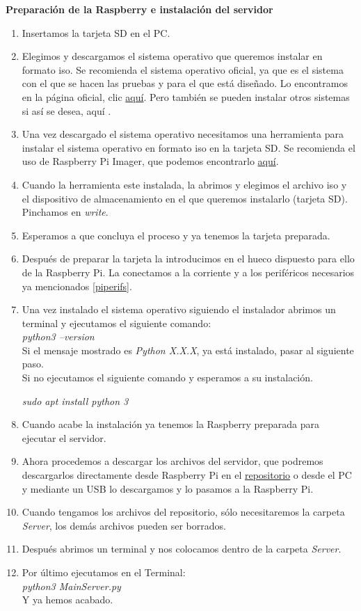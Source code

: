 \textbf{Preparación de la Raspberry e instalación del servidor}\\

\begin{enumerate}
\item
	Insertamos la tarjeta SD en el PC.
\item
	Elegimos y descargamos el sistema operativo que queremos instalar en formato iso.
	Se recomienda el sistema operativo oficial, ya que es el sistema con el que se hacen las pruebas y para el que está diseñado. Lo encontramos en la página oficial, clic \href{https://www.raspberrypi.org/software/operating-systems/#raspberry-pi-os-32-bit}{aquí}.
	Pero también se pueden instalar otros sistemas si así se desea, aquí \cite{pios}.
\item
	Una vez descargado el sistema operativo necesitamos una herramienta para instalar el sistema operativo en formato iso en la tarjeta SD.
	Se recomienda el uso de Raspberry Pi Imager, que podemos encontrarlo \href{https://www.raspberrypi.org/software/}{aquí}.
\item
	Cuando la herramienta este instalada, la abrimos y elegimos el archivo iso y el dispositivo de almacenamiento en el que queremos instalarlo (tarjeta SD).
	Pinchamos en \textit{write}.
\item
	Esperamos a que concluya el proceso y ya tenemos la tarjeta preparada.
\item
	Después de preparar la tarjeta la introducimos en el hueco dispuesto para ello de la Raspberry Pi. La conectamos a la corriente y a los periféricos necesarios ya mencionados \ref{piperifs}.
\item
	Una vez instalado el sistema operativo siguiendo el instalador abrimos un terminal y ejecutamos el siguiente comando:\\
	\textit{python3 --version}\\
	Si el mensaje mostrado es \textit{Python X.X.X}, ya está instalado, pasar al siguiente paso.\\
	Si no ejecutamos el siguiente comando y esperamos a su instalación.
	
	\textit{sudo apt install python 3}
\item
	Cuando acabe la instalación ya tenemos la Raspberry preparada para ejecutar el servidor.
\item
	Ahora procedemos a descargar los archivos del servidor, que podremos descargarlos directamente desde Raspberry Pi en el \href{https://github.com/fmv1001/LocalStream}{repositorio} o desde el PC y mediante un USB lo descargamos y lo pasamos a la Raspberry Pi.
\item
	Cuando tengamos los archivos del repositorio, sólo necesitaremos la carpeta \textit{Server}, los demás archivos pueden ser borrados.
\item
	Después abrimos un terminal y nos colocamos dentro de la carpeta \textit{Server}.
\item
	Por último ejecutamos en el Terminal:\\
	\textit{python3 MainServer.py}\\
	Y ya hemos acabado.
\end{enumerate}

